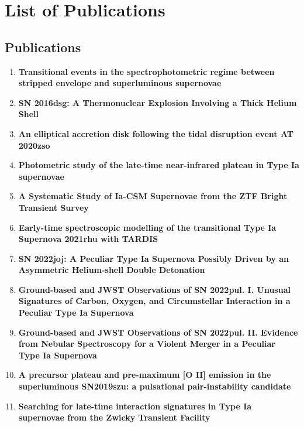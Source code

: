\chapter{List of Publications}
\label{chapter:publications}
%
\begin{singlespace}
\vspace{-5mm}



\section*{Publications}
\begin{enumerate}
\item \textbf{Transitional events in the spectrophotometric regime between stripped envelope and superluminous supernovae} \citep{Prentice_2021} %
\item \textbf{SN 2016dsg: A Thermonuclear Explosion Involving a Thick Helium Shell} \citep{2016dsg} %
\item \textbf{An elliptical accretion disk following the tidal disruption event AT 2020zso} \citep{2020zso} %
\item \textbf{Photometric study of the late-time near-infrared plateau in Type Ia supernovae} \citep{Late_NIR_plateau} %
\item \textbf{A Systematic Study of Ia-CSM Supernovae from the ZTF Bright Transient Survey} \citep{Ia-CSM_BTS} %
\item \textbf{Early-time spectroscopic modelling of the transitional Type Ia Supernova 2021rhu with TARDIS} \citep{2021rhu} %
\item \textbf{SN 2022joj: A Peculiar Type Ia Supernova Possibly Driven by an Asymmetric Helium-shell Double Detonation} \citep{2022joj} %
\item \textbf{Ground-based and JWST Observations of SN 2022pul. I. Unusual Signatures of Carbon, Oxygen, and Circumstellar Interaction in a Peculiar Type Ia Supernova} \citep{2022pul_I} %
\item \textbf{Ground-based and JWST Observations of SN 2022pul. II. Evidence from Nebular Spectroscopy for a Violent Merger in a Peculiar Type Ia Supernova} \citep{2022pul_II} %
\item \textbf{A precursor plateau and pre-maximum [O II] emission in the superluminous SN2019szu: a pulsational pair-instability candidate} \citep{2019szu} %
\item \textbf{Searching for late-time interaction signatures in Type Ia supernovae from the Zwicky Transient Facility} \citep{Terwel_2024_paper1} %

\end{enumerate}
\end{singlespace}
